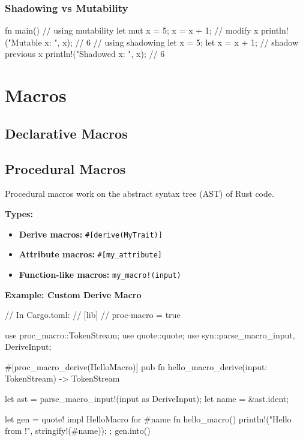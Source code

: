 \documentclass[8pt,a4paper,twocolumn]{extarticle}
\begin{document}
\subsubsection{Shadowing vs Mutability}
\begin{Code}
fn main() {
    // using mutability
    let mut x = 5;
    x = x + 1; // modify x
    println!("Mutable x: {}", x); // 6
    // using shadowing
    let x = 5;
    let x = x + 1; // shadow previous x
    println!("Shadowed x: {}", x); // 6
}
\end{Code}
\section{Macros}
\subsection{Declarative Macros}

\subsection{Procedural Macros}

Procedural macros work on the abstract syntax tree (AST) of Rust code.

\textbf{Types:}
\begin{itemize}
  \item \textbf{Derive macros:} \texttt{\#[derive(MyTrait)]}
  \item \textbf{Attribute macros:} \texttt{\#[my\_attribute]}
  \item \textbf{Function-like macros:} \texttt{my\_macro!(input)}
\end{itemize}

\textbf{Example: Custom Derive Macro}
\begin{Code}
// In Cargo.toml:
// [lib]
// proc-macro = true

use proc_macro::TokenStream;
use quote::quote;
use syn::{parse_macro_input, DeriveInput};

#[proc_macro_derive(HelloMacro)]
pub fn hello_macro_derive(input: TokenStream) -> TokenStream {
    let ast = parse_macro_input!(input as DeriveInput);
    let name = &ast.ident;
    
    let gen = quote! {
        impl HelloMacro for #name {
            fn hello_macro() {
                println!("Hello from {}!", stringify!(#name));
            }
        }
    };
    gen.into()
}
\end{Code}
\end{document}

